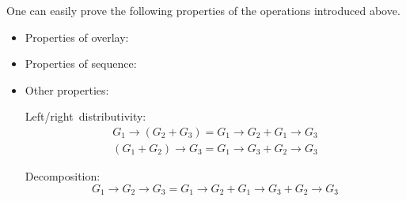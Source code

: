 One can easily prove the following properties of the operations introduced
above.
\begin{itemize}
\item \hspace{-1mm}Properties of overlay:

\item \hspace{-1mm}Properties of sequence:

\item \hspace{-1mm}Other properties:


\hspace{2mm}Left/right~distributivity: \vspace{-0.3em}
\[
\begin{array}{c}
G_{1}\rightarrow(G_{2}+G_{3})=G_{1}\rightarrow G_{2}+G_{1}\rightarrow G_{3}\\
(G_{1}+G_{2})\rightarrow G_{3}=G_{1}\rightarrow G_{3}+G_{2}\rightarrow G_{3}
\end{array}
\]
\vspace{-1em}


\hspace{2mm}Decomposition: \vspace{-0.3em}
\[
G_{1}\!\rightarrow\! G_{2}\!\rightarrow\! G_{3}\!=\! G_{1}\!\rightarrow\! G_{2}+G_{1}\!\rightarrow\! G_{3}+G_{2}\!\rightarrow\! G_{3}
\]
\vspace{-1.3em}



\end{itemize}

